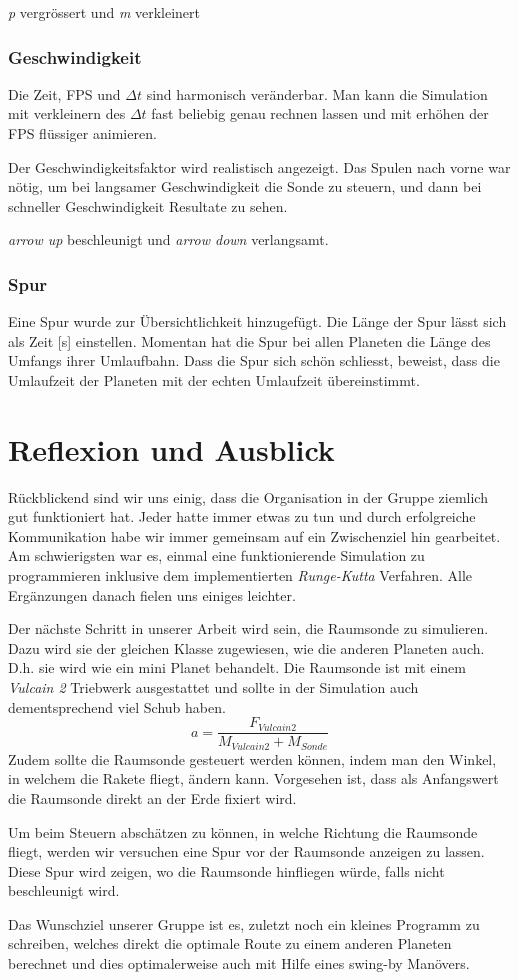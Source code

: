 \documentclass{article}
\begin{document}
\textit{p} vergrössert und \textit{m} verkleinert
\subsubsection{Geschwindigkeit}
Die Zeit, FPS und $\Delta t$ sind harmonisch veränderbar. Man kann die Simulation mit verkleinern des $\Delta t$ fast beliebig 
genau rechnen lassen und mit erhöhen der FPS flüssiger animieren.

Der Geschwindigkeitsfaktor wird realistisch angezeigt. Das Spulen nach vorne war nötig, um bei langsamer Geschwindigkeit die Sonde zu steuern, und dann bei schneller Geschwindigkeit Resultate zu sehen.

\textit{arrow up} beschleunigt und \textit{arrow down} verlangsamt.

\subsubsection{Spur}
Eine Spur wurde zur Übersichtlichkeit hinzugefügt. Die Länge der Spur lässt sich als Zeit [s] einstellen. Momentan hat die Spur bei allen Planeten die Länge des Umfangs ihrer Umlaufbahn. Dass die Spur sich schön schliesst, beweist, dass die Umlaufzeit der Planeten mit der echten Umlaufzeit übereinstimmt.


\section{Reflexion und Ausblick}
Rückblickend sind wir uns einig, dass die Organisation in der Gruppe ziemlich gut funktioniert hat. Jeder hatte immer etwas zu tun und durch erfolgreiche Kommunikation habe wir immer gemeinsam auf ein Zwischenziel hin gearbeitet. Am schwierigsten war es, einmal eine funktionierende Simulation zu programmieren inklusive dem implementierten \textit{Runge-Kutta} Verfahren. Alle Ergänzungen danach fielen uns einiges leichter. 


Der nächste Schritt in unserer Arbeit wird sein, die Raumsonde zu simulieren. Dazu wird sie der gleichen Klasse zugewiesen, wie die anderen Planeten auch. 
D.h. sie wird wie ein mini Planet behandelt. Die Raumsonde ist mit einem \textit{Vulcain 2} Triebwerk ausgestattet und sollte in der Simulation auch dementsprechend viel Schub haben. 
$$ a = \frac{F_{Vulcain2}}{M_{Vulcain2} + M_{Sonde}} $$
Zudem sollte die Raumsonde gesteuert werden können, indem man den Winkel, in welchem die Rakete fliegt, ändern kann. Vorgesehen ist, dass als Anfangswert die Raumsonde direkt an der Erde fixiert wird. 

Um beim Steuern abschätzen zu können, in welche Richtung die Raumsonde fliegt, werden wir versuchen eine Spur vor der Raumsonde anzeigen zu lassen. Diese Spur wird zeigen, wo die Raumsonde hinfliegen würde, falls nicht beschleunigt wird.

Das Wunschziel unserer Gruppe ist es, zuletzt noch ein kleines Programm zu schreiben, welches direkt die optimale Route zu einem anderen Planeten berechnet und dies optimalerweise auch mit Hilfe eines swing-by Manövers.
\end{document}
